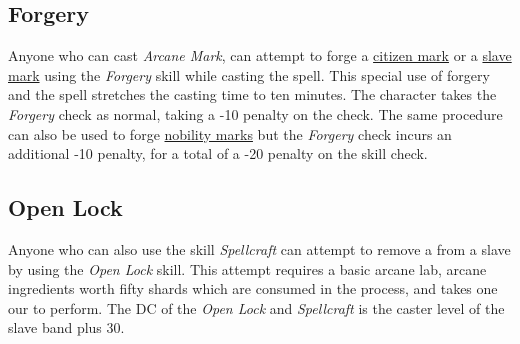 \subsection{Forgery}
\label{sec:Forgery}

Anyone who can cast \emph{Arcane Mark}, can attempt to forge a
\hyperref[sec:Citizen Mark]{citizen mark} or a \hyperref[sec:Slave Mark]{slave
mark} using the \emph{Forgery} skill while casting the spell. This special
use of forgery and the spell stretches the casting time to ten minutes. The
character takes the \emph{Forgery} check as normal, taking a -10 penalty on
the check. The same procedure can also be used to forge \hyperref[sec:Nobility
Mark]{nobility marks} but the \emph{Forgery} check incurs an additional -10
penalty, for a total of a -20 penalty on the skill check.

\subsection{Open Lock}
\label{sec:Open Lock}

Anyone who can also use the skill \emph{Spellcraft} can attempt to remove
a  from a slave by using the \emph{Open Lock} skill.
This attempt requires a basic arcane lab, arcane ingredients worth fifty
shards which are consumed in the process, and takes one our to perform.
The DC of the \emph{Open Lock} and \emph{Spellcraft} is the caster level
of the slave band plus 30.

\FloatBarrier
